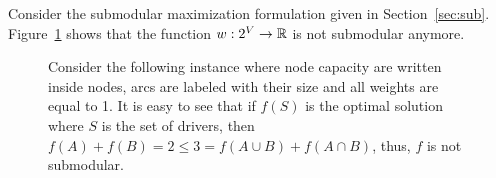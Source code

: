 Consider the submodular maximization formulation given in Section~\ref{sec:sub}.
Figure~\ref{fig:not submodular} shows that the function $w : 2^V \to \mathbb{R}$ is not
submodular anymore.

\begin{figure}
\begin{center}

\end{center}
\caption{Consider the following instance where node capacity are
written inside nodes, arcs are labeled with their size and all weights
are equal to 1.  It is easy to see that if $f(S)$ is the optimal
solution where $S$ is the set of drivers, then $f(A) + f(B) = 2 \leq 3
= f(A \cup B) + f(A \cap B)$, thus, $f$ is not submodular.}
\label{fig:not submodular}
\end{figure}
